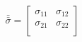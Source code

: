 $$\bar{\bar{\sigma}}=\begin{bmatrix}
  \sigma_{11} & \sigma_{12} \\
  \sigma_{21} & \sigma_{22} \\
\end{bmatrix}$$

